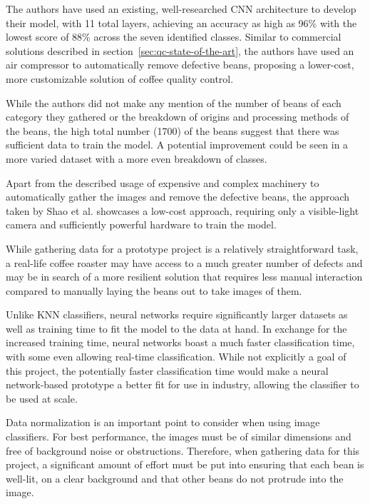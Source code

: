 The authors have used an existing, well-researched CNN architecture to develop
their model, with 11 total layers, achieving an accuracy as high as 96\% with the
lowest score of 88\% across the seven identified classes.
Similar to commercial solutions
described in section~\ref{sec:qc-state-of-the-art}, the authors have used an air
compressor to automatically remove defective beans, proposing a lower-cost, more
customizable solution of coffee quality control.

While the authors did not make any mention of the number of beans of each
category they gathered or the breakdown of origins and processing methods of the
beans, the high total number (1700) of the beans suggest that there was sufficient
data to train the model.
A potential improvement could be seen in a more varied
dataset with a more even breakdown of classes.

Apart from the described usage of expensive and complex machinery to
automatically gather the images and remove the defective beans, the approach taken
by Shao et al.\cite{rgbDeepLearningShao} showcases a low-cost approach, requiring only a visible-light camera
and sufficiently powerful hardware to train the model.

While gathering data for a prototype project is a relatively straightforward task,
a real-life coffee roaster may have access to a much greater number of defects
and may be in search of a more resilient solution that requires less manual
interaction compared to manually laying the beans out to take images of them.

Unlike KNN classifiers, neural networks require significantly larger datasets as
well as training time to fit the model to the data at hand.
In exchange for the increased
training time, neural networks boast a much faster classification time, with some
even allowing real-time classification.
While not explicitly a goal of this
project, the potentially faster classification time would make a neural network-based
prototype a better fit for use in industry, allowing the classifier to be used
at scale.

Data normalization is an important point to consider when using image
classifiers.
For best performance, the images must be of similar dimensions and
free of background noise or obstructions.
Therefore, when gathering data for
this project, a significant amount of effort must be put into ensuring that each
bean is well-lit, on a clear background and that other beans do not protrude
into the image.


